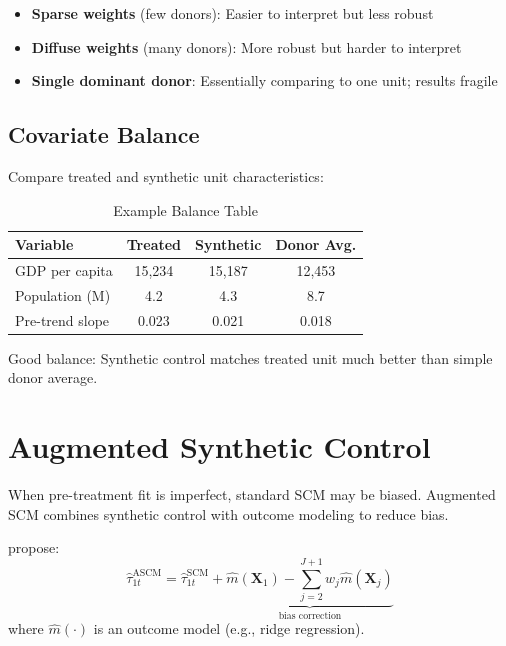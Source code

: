 \begin{remark}
\begin{itemize}
    \item \textbf{Sparse weights} (few donors): Easier to interpret but less robust
    \item \textbf{Diffuse weights} (many donors): More robust but harder to interpret
    \item \textbf{Single dominant donor}: Essentially comparing to one unit; results fragile
\end{itemize}
\end{remark}

\subsection{Covariate Balance}

Compare treated and synthetic unit characteristics:

\begin{table}[htbp]
\centering
\caption{Example Balance Table}
\label{tab:scm_balance}
\begin{tabular}{lccc}
\toprule
\textbf{Variable} & \textbf{Treated} & \textbf{Synthetic} & \textbf{Donor Avg.} \\
\midrule
GDP per capita & 15,234 & 15,187 & 12,453 \\
Population (M) & 4.2 & 4.3 & 8.7 \\
Pre-trend slope & 0.023 & 0.021 & 0.018 \\
\bottomrule
\end{tabular}
\end{table}

Good balance: Synthetic control matches treated unit much better than simple donor average.

\section{Augmented Synthetic Control}
\label{sec:scm_augmented}

When pre-treatment fit is imperfect, standard SCM may be biased. Augmented SCM combines synthetic control with outcome modeling to reduce bias.

\begin{definition}
\label{def:ascm}
\citet{benmichael2021augmented} propose:
\begin{equation}
    \hat{\tau}_{1t}^{\text{ASCM}} = \hat{\tau}_{1t}^{\text{SCM}} + \underbrace{\hat{m}(\mathbf{X}_1) - \sum_{j=2}^{J+1} w_j \hat{m}(\mathbf{X}_j)}_{\text{bias correction}}
    \label{eq:ascm}
\end{equation}
where $\hat{m}(\cdot)$ is an outcome model (e.g., ridge regression).
\end{definition}

